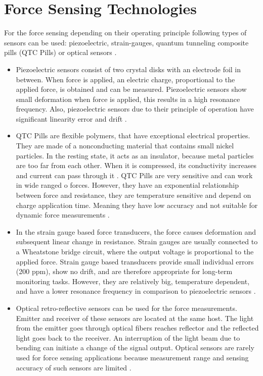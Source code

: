 \section{Force Sensing Technologies}
\label{sec:ForceSensors}

For the force sensing depending on their operating principle following types of sensors can be used: piezoelectric, strain-gauges, quantum tunneling composite pills (QTC Pills) or optical sensors \cite{SGandP1}.

\begin{itemize}
\item Piezoelectric sensors consist of two crystal disks with an electrode foil in between. When force is applied, an electric charge, proportional to the applied force, is obtained and can be measured. Piezoelectric sensors show small deformation when force is applied, this results in a high resonance frequency. Also, piezoelectric sensors due to their principle of operation have significant linearity error and drift \cite{SGandP2}.

\item QTC Pills are flexible polymers, that have exceptional electrical properties. They are made of a nonconducting material that contains small nickel particles.  In the resting state, it acts as an insulator, because metal particles are too far from each other. When it is compressed, its conductivity increases and current can pass through it \cite{azaman_characteristic_2016}. QTC Pills are very sensitive and can work in wide ranged o forces. However, they have an exponential relationship between force and resistance, they are temperature sensitive and depend on charge application time. Meaning they have low accuracy and not suitable for dynamic force measurements \cite{_quantum_2010}.

\item In the strain gauge based force transducers, the force causes deformation and subsequent linear change in resistance. Strain gauges are usually connected to a Wheatstone bridge circuit, where the output voltage is proportional to the applied force. Strain gauge based transducers provide small individual errors (200 ppm), show no drift, and are therefore appropriate for long-term monitoring tasks. However, they are relatively big, temperature dependent, and have a lower resonance frequency in comparison to piezoelectric sensors \cite{SGandP1,SGandP2}.

\item Optical retro-reflective sensors can be used for the force measurements. Emitter and receiver of these sensors are located at the same host. The light from the emitter goes through optical fibers reaches reflector and the reflected light goes back to the receiver. An interruption of the light beam due to bending can initiate a change of the signal output. Optical sensors are rarely used for force sensing applications because measurement range and sensing accuracy of such sensors are limited \cite{su_fiber_optic_2017}.
\end{itemize}

